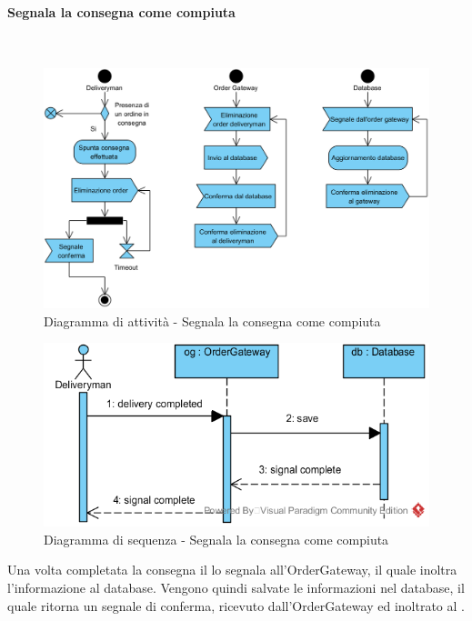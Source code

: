 \begin{samepage}
\paragraph{Segnala la consegna come compiuta}\mbox{}\\
\begin{figure}[H]
	\centering
	\includegraphics[width=14cm]{diagrammi_img/attivita/deliveryman_consegnato.png}
	\caption{Diagramma di attività - Segnala la consegna come compiuta}
\end{figure}
\end{samepage}
\begin{figure}[H]
	\centering
	\includegraphics[width=14cm]{../../documenti/SpecificaTecnica/diagrammi_img/sequenza/fattorino_segnala_consegna_completata.png}
	\caption{Diagramma di sequenza - Segnala la consegna come compiuta}
\end{figure}
Una volta completata la consegna il \Deliveryman{} lo segnala all'Order\-Gateway, il quale inoltra l'informazione al database. Vengono quindi salvate le informazioni nel database, il quale ritorna un segnale di conferma, ricevuto dall'Order\-Gateway ed inoltrato al \Deliveryman{}.

